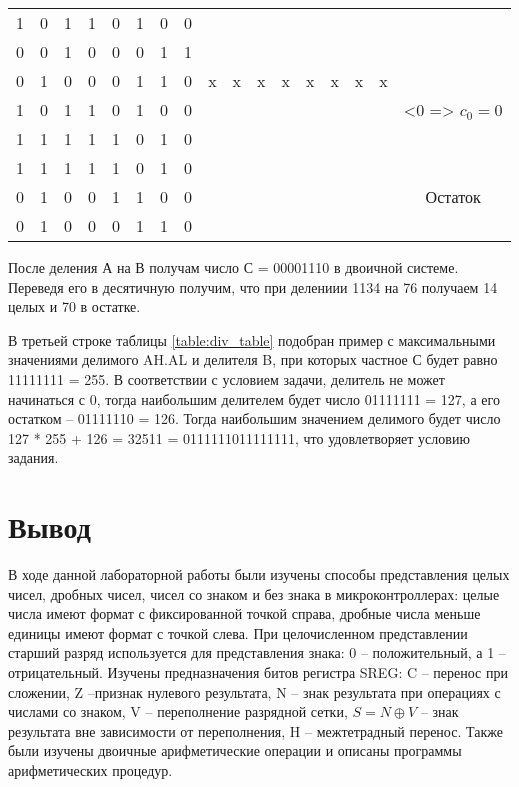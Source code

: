 \documentclass{bmstu}
\begin{document}
\begin{table}[H]
\begin{tabular}{|cccccccc|cccccccc|c|}
		1&0&1&1&0&1&0&0&&&&&&&&&\\
	\cline{1-16}
		0&0&1&0&0&0&1&1&&&&&&&&&\\
	\hline
	\hline
		0&1&0&0&0&1&1&0&x&x&x&x&x&x&x&x&\multirow{3}{10em}{<0 => $c_0 = 0$}\\
		1&0&1&1&0&1&0&0&&&&&&&&&\\
	\cline{1-16}
		1&1&1&1&1&0&1&0&&&&&&&&&\\
	\hline
	\hline
		1&1&1&1&1&0&1&0&&&&&&&&&\multirow{3}{10em}{Остаток}\\
		0&1&0&0&1&1&0&0&&&&&&&&&\\
	\cline{1-16}
		0&1&0&0&0&1&1&0&&&&&&&&&\\
	\hline
	\end{tabular}
\end{table}

После деления А на В получам число С = 00001110 в двоичной системе. Переведя его в десятичную получим, что при делениии 1134 на 76 получаем 14 целых и 70 в остатке.

В третьей строке таблицы \ref{table:div_table} подобран пример с максимальными значениями делимого AH.AL и 
делителя B, при которых частное С будет равно 11111111 = 255. В соответствии с условием задачи, делитель не может 
начинаться с 0, тогда наибольшим делителем будет число 01111111 = 127, а его остатком – 01111110 = 126. Тогда 
наибольшим значением делимого будет число 127 * 255 + 126 = 32511 = 0111111011111111, что удовлетворяет условию 
задания. \\

\chapter{Вывод}

В ходе данной лабораторной работы были изучены способы представления целых чисел, дробных чисел, чисел со знаком и 
без знака в микроконтроллерах: целые числа имеют формат с фиксированной точкой справа, дробные числа меньше 
единицы имеют формат с точкой слева. При целочисленном представлении старший разряд используется для представления 
знака: 0 – положительный, а 1 – отрицательный. Изучены предназначения битов регистра SREG: C – перенос при 
сложении, Z –признак нулевого результата, N – знак результата при операциях с числами со знаком, V – переполнение 
разрядной сетки, $S=N \oplus V$ – знак результата вне зависимости от переполнения, H – межтетрадный перенос. Также 
были изучены двоичные арифметические операции и описаны программы арифметических процедур.
\end{document}
